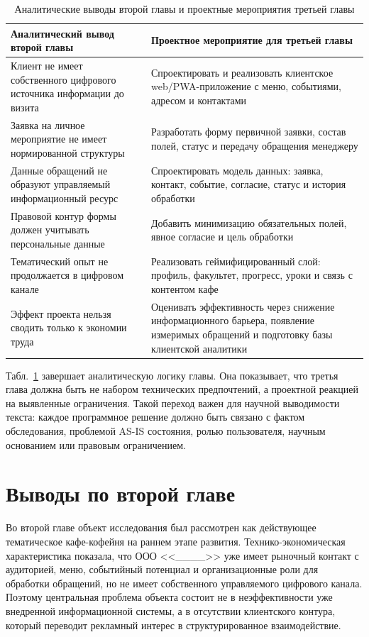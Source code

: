 \begin{table}[H]
\centering
\small
\caption{Аналитические выводы второй главы и проектные мероприятия третьей главы}
\label{tab:ch2_to_ch3_bridge}
\begin{tabularx}{\textwidth}{|>{\raggedright\arraybackslash}p{}|>{\raggedright\arraybackslash}X|}
\hline
\textbf{Аналитический вывод второй главы} & \textbf{Проектное мероприятие для третьей главы} \\ \hline
Клиент не имеет собственного цифрового источника информации до визита & Спроектировать и реализовать клиентское web/PWA-приложение с меню, событиями, адресом и контактами \\ \hline
Заявка на личное мероприятие не имеет нормированной структуры & Разработать форму первичной заявки, состав полей, статус и передачу обращения менеджеру \\ \hline
Данные обращений не образуют управляемый информационный ресурс & Спроектировать модель данных: заявка, контакт, событие, согласие, статус и история обработки \\ \hline
Правовой контур формы должен учитывать персональные данные & Добавить минимизацию обязательных полей, явное согласие и цель обработки \\ \hline
Тематический опыт не продолжается в цифровом канале & Реализовать геймифицированный слой: профиль, факультет, прогресс, уроки и связь с контентом кафе \\ \hline
Эффект проекта нельзя сводить только к экономии труда & Оценивать эффективность через снижение информационного барьера, появление измеримых обращений и подготовку базы клиентской аналитики \\ \hline
\end{tabularx}
\normalsize
\end{table}

Табл.~\ref{tab:ch2_to_ch3_bridge} завершает аналитическую логику главы. Она показывает, что третья глава должна быть не набором технических предпочтений, а проектной реакцией на выявленные ограничения. Такой переход важен для научной выводимости текста: каждое программное решение должно быть связано с фактом обследования, проблемой AS-IS состояния, ролью пользователя, научным основанием или правовым ограничением.

\section{Выводы по второй главе}

Во второй главе объект исследования был рассмотрен как действующее тематическое кафе-кофейня на раннем этапе развития. Технико-экономическая характеристика показала, что ООО <<\_\_\_\_>> уже имеет рыночный контакт с аудиторией, меню, событийный потенциал и организационные роли для обработки обращений, но не имеет собственного управляемого цифрового канала. Поэтому центральная проблема объекта состоит не в неэффективности уже внедренной информационной системы, а в отсутствии клиентского контура, который переводит рекламный интерес в структурированное взаимодействие.

